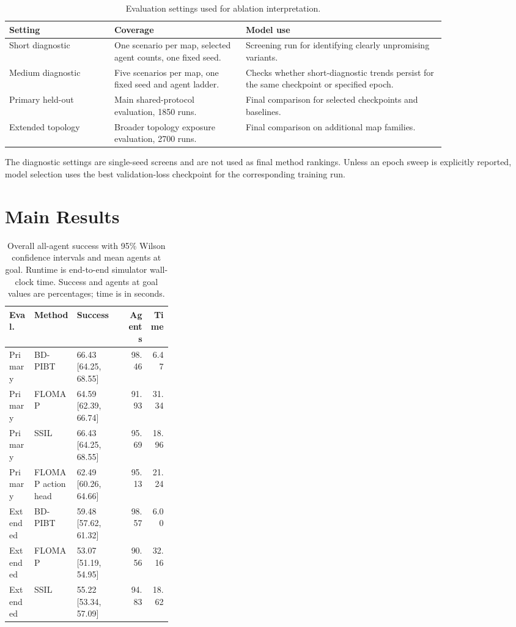 \documentclass[conference]{IEEEtran}
\begin{document}
\begin{table}[!tbp]
\centering
\caption{Evaluation settings used for ablation interpretation.}
\label{tab:eval-settings}
\scriptsize
\setlength{\tabcolsep}{3pt}
\begin{tabular}{p{0.20\linewidth}p{0.25\linewidth}p{0.38\linewidth}}
\toprule
Setting & Coverage & Model use \\
\midrule
Short diagnostic & One scenario per map, selected agent counts, one fixed seed. &
Screening run for identifying clearly unpromising variants. \\
Medium diagnostic & Five scenarios per map, one fixed seed and agent ladder. &
Checks whether short-diagnostic trends persist for the same checkpoint or
specified epoch. \\
Primary held-out & Main shared-protocol evaluation, 1850 runs. & Final
comparison for selected checkpoints and baselines. \\
Extended topology & Broader topology exposure evaluation, 2700 runs. & Final
comparison on additional map families. \\
\bottomrule
\end{tabular}
\end{table}

The diagnostic settings are single-seed screens and are not used as final
method rankings.  Unless an epoch sweep is explicitly reported, model selection
uses the best validation-loss checkpoint for the corresponding training run.

\section{Main Results}

\begin{table}[!t]
\centering
\caption{Overall all-agent success with 95\% Wilson confidence intervals and
mean agents at goal.  Runtime is end-to-end simulator wall-clock time.  Success
and agents at goal values are percentages; time is in seconds.}
\label{tab:overall}
\scriptsize
\setlength{\tabcolsep}{2pt}
\begin{tabular}{llp{0.31\linewidth}rr}
\toprule
Eval. & Method & Success & Agents & Time \\
\midrule
Primary & BD-PIBT & 66.43 [64.25, 68.55] & 98.46 & 6.47 \\
Primary & FLOMAP & 64.59 [62.39, 66.74] & 91.93 & 31.34 \\
Primary & SSIL & 66.43 [64.25, 68.55] & 95.69 & 18.96 \\
Primary & FLOMAP action head & 62.49 [60.26, 64.66] & 95.13 & 21.24 \\
Extended & BD-PIBT & 59.48 [57.62, 61.32] & 98.57 & 6.00 \\
Extended & FLOMAP & 53.07 [51.19, 54.95] & 90.56 & 32.16 \\
Extended & SSIL & 55.22 [53.34, 57.09] & 94.83 & 18.62 \\
\bottomrule
\end{tabular}
\end{table}
\end{document}
